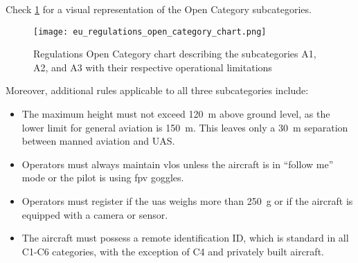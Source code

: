 Check \cref{fig:eu_regulations_open_category_chart} for a visual representation of the Open Category subcategories.

\begin{figure}
  \texttt{[image: eu\_regulations\_open\_category\_chart.png]}
  \caption{ Regulations Open Category chart describing the subcategories A1, A2, and A3 with their respective operational limitations \autocite{ageagleEuropeanUnion}}\label{fig:eu_regulations_open_category_chart}
\end{figure}

Moreover, additional rules applicable to all three subcategories include:

\begin{itemize}
  \item The maximum height must not exceed \SI{120}{\meter} above ground level, as the lower limit for general aviation is \SI{150}{\meter}. This leaves only a \SI{30}{\meter} separation between manned aviation and UAS.\@

  \item Operators must always maintain \gls{vlos} unless the aircraft is in ``follow me'' mode or the pilot is using \gls{fpv} goggles.

  \item Operators must register if the \gls{uas} weighs more than \SI{250}{\gram} or if the aircraft is equipped with a camera or sensor.

  \item The aircraft must possess a remote identification ID, which is standard in all C1-C6 categories, with the exception of C4 and privately built aircraft.
\end{itemize}

